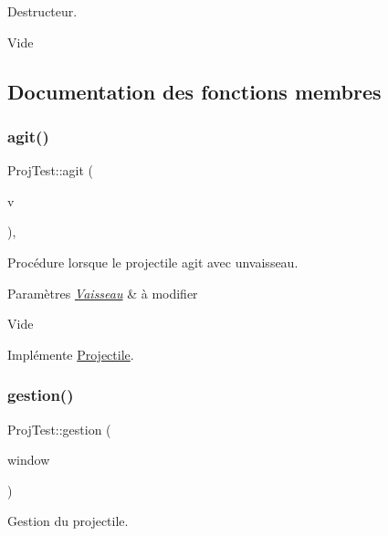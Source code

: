 Destructeur. 

Vide 

\subsection{Documentation des fonctions membres}
\mbox{\label{class_proj_test_a3adb674973dcd21c6ddaee809b719a65}} 
\subsubsection{\texorpdfstring{agit()}{agit()}}
{\footnotesize\ttfamily Proj\+Test\+::agit (\begin{DoxyParamCaption}\item[{\hyperlink{class_vaisseau}{Vaisseau} \&}]{v }\end{DoxyParamCaption})\hspace{0.3cm}{\ttfamily [inline]}, {\ttfamily [virtual]}}



Procédure lorsque le projectile agit avec unvaisseau. 


\begin{DoxyParams}{Paramètres}
{\em \hyperlink{class_vaisseau}{Vaisseau}} & à modifier\\
\hline
\end{DoxyParams}
Vide 

Implémente \hyperlink{class_projectile_a8550c8b1b012c5c290fb6da5b06f57ef}{Projectile}.

\mbox{\label{class_proj_test_a6649e6591e463315aa9513854e2515d4}} 
\subsubsection{\texorpdfstring{gestion()}{gestion()}}
{\footnotesize\ttfamily Proj\+Test\+::gestion (\begin{DoxyParamCaption}\item[{sf\+::\+Render\+Window \&}]{window }\end{DoxyParamCaption})\hspace{0.3cm}{\ttfamily [virtual]}}



Gestion du projectile. 


